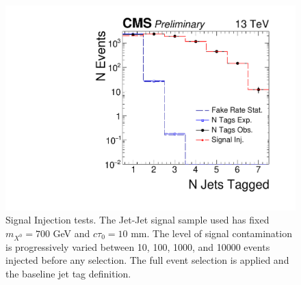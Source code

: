 \begin{figure}
\begin{center}
\includegraphics[width=.45\textwidth]{figures/an/ANALYSIS/76x_pu/INJECTION/qcd_loose_displacedEvtSel_10000eV.pdf}
\caption{Signal Injection tests. The Jet-Jet signal sample used has fixed $m_{X^0}=700$ GeV and $c\tau_0=10$ mm. The
level of signal contamination is progressively varied between 10, 100, 1000, and 10000 events injected before any selection. The full 
event selection is applied and the baseline jet tag definition. \label{fig:injection_700_10mm}}
\end{center}
\end{figure}
